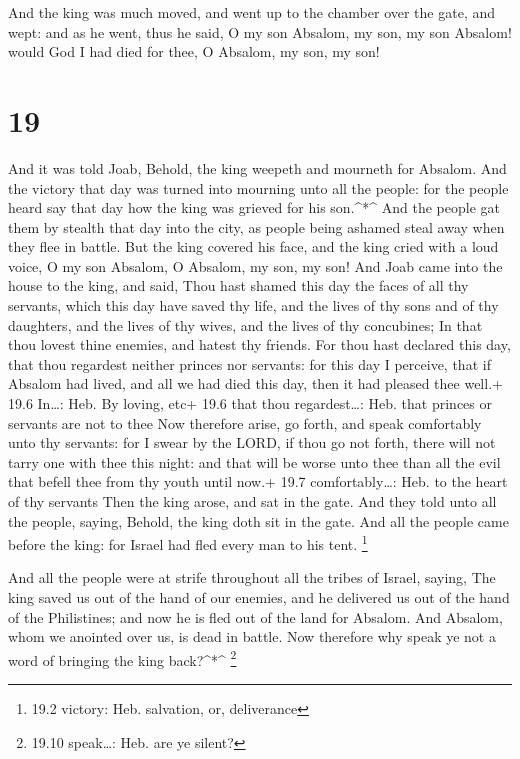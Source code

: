  And the king was much moved, and went up to the chamber
over the gate, and wept: and as he went, thus he said, O my son Absalom,
my son, my son Absalom! would God I had died for thee, O Absalom, my
son, my son!

\hypertarget{section-18}{%
\section{19}\label{section-18}}

 And it was told Joab, Behold, the king weepeth and mourneth
for Absalom.  And the victory that day was turned into
mourning unto all the people: for the people heard say that day how the
king was grieved for his son.\^{}*\^{}  And the people gat
them by stealth that day into the city, as people being ashamed steal
away when they flee in battle.  But the king covered his
face, and the king cried with a loud voice, O my son Absalom, O Absalom,
my son, my son!  And Joab came into the house to the king,
and said, Thou hast shamed this day the faces of all thy servants, which
this day have saved thy life, and the lives of thy sons and of thy
daughters, and the lives of thy wives, and the lives of thy concubines;
 In that thou lovest thine enemies, and hatest thy friends.
For thou hast declared this day, that thou regardest neither princes nor
servants: for this day I perceive, that if Absalom had lived, and all we
had died this day, then it had pleased thee well.+ 19.6 In\ldots: Heb.
By loving, etc+ 19.6 that thou regardest\ldots: Heb. that princes or
servants are not to thee  Now therefore arise, go forth, and
speak comfortably unto thy servants: for I swear by the LORD, if thou go
not forth, there will not tarry one with thee this night: and that will
be worse unto thee than all the evil that befell thee from thy youth
until now.+ 19.7 comfortably\ldots: Heb. to the heart of thy servants
 Then the king arose, and sat in the gate. And they told
unto all the people, saying, Behold, the king doth sit in the gate. And
all the people came before the king: for Israel had fled every man to
his tent. \footnote{19.2 victory: Heb. salvation, or, deliverance}

 And all the people were at strife throughout all the tribes
of Israel, saying, The king saved us out of the hand of our enemies, and
he delivered us out of the hand of the Philistines; and now he is fled
out of the land for Absalom.  And Absalom, whom we anointed
over us, is dead in battle. Now therefore why speak ye not a word of
bringing the king back?\^{}*\^{} \footnote{19.10 speak\ldots: Heb. are
  ye silent?}

